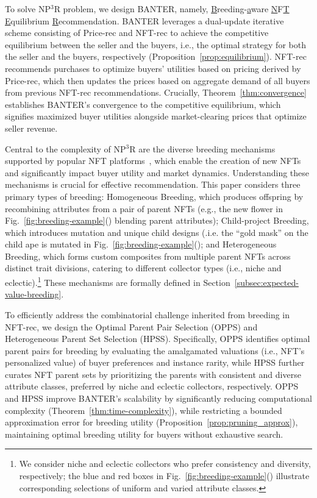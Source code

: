\documentclass[conference]{IEEEtran}
\theoremstyle{plain}
\begin{document}
To solve NP$^3$R problem, we design BANTER, namely, \underline{B}reeding-\underline{a}ware \underline{N}F\underline{T} \underline{E}quilibrium \underline{R}ecommen\-dation. 
    BANTER leverages a dual-update iterative scheme consisting of Price-rec and NFT-rec to achieve the competitive equilibrium between the seller and the buyers, i.e., the optimal strategy for both the seller and the buyers, respectively (Proposition~\ref{prop:equilibrium}). NFT-rec recommends purchases to optimize buyers' utilities based on pricing derived by Price-rec, which then updates the prices based on aggregate demand of all buyers from previous NFT-rec recommendations. Crucially, Theorem~\ref{thm:convergence} establishes BANTER's convergence to the competitive equilibrium, which signifies maximized buyer utilities alongside market-clearing prices that optimize seller revenue.

    Central to the complexity of NP$^3$R are the diverse breeding mechanisms supported by popular NFT platforms~\cite{opensea}, which enable the creation of new NFTs and significantly impact buyer utility and market dynamics. Understanding these mechanisms is crucial for effective recommendation. This paper considers three primary types of breeding:
    Homogeneous Breeding, which produces offspring by recombining attributes from a pair of parent NFTs (e.g., the new flower in Fig.~\ref{fig:breeding-example}() blending parent attributes); Child-project Breeding, which introduces mutation and unique child designs (.i.e. the ``gold mask'' on the child ape is mutated in Fig.~\ref{fig:breeding-example}(); and Heterogeneous Breeding, which forms custom composites from multiple parent NFTs across distinct trait divisions, catering to different collector types (i.e., niche and eclectic).\footnote{We consider niche and eclectic collectors who prefer consistency and diversity, respectively; the blue and red boxes in Fig.~\ref{fig:breeding-example}() illustrate corresponding selections of uniform and varied attribute classes.}
    These mechanisms are formally defined in Section~\ref{subsec:expected-value-breeding}.

    To efficiently address the combinatorial challenge inherited from breeding in NFT-rec, we design the Optimal Parent Pair Selection (OPPS) and Heterogeneous Parent Set Selection (HPSS). Specifically, OPPS identifies optimal parent pairs for breeding by evaluating the amalgamated valuations (i.e., NFT's personalized value) of buyer preferences and instance rarity, while HPSS further curates NFT parent sets by prioritizing the parents with consistent and diverse attribute classes, preferred by niche and eclectic collectors, respectively. OPPS and HPSS improve BANTER's scalability by significantly reducing computational complexity (Theorem~\ref{thm:time-complexity}), while restricting a bounded approximation error for breeding utility (Proposition~\ref{prop:pruning_approx}), maintaining optimal breeding utility for buyers without exhaustive search.
\end{document}
